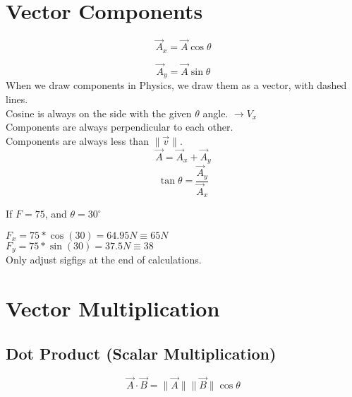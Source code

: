 \documentclass[]{article}
\date{Wednesday, January 25\textsuperscript{th}, 2023}
\title{\docTitle}
\author{\docAuthor}
\date{\today}
\begin{document}
\maketitle
\section*{Vector Components}
\begin{equation*}
    \overrightarrow{A}_x = \overrightarrow{A}\cos\theta
\end{equation*}

\begin{equation*}
    \overrightarrow{A}_y = \overrightarrow{A}\sin\theta
\end{equation*}
When we draw components in Physics, we draw them as a vector, with dashed lines.\\
Cosine is always on the side with the given $\theta$ angle. $\rightarrow V_x$\\
Components are always perpendicular to each other.\\
Components are always less than $\lVert \overrightarrow{v} \rVert$.\\
\begin{equation*}
    \overrightarrow{A} = \overrightarrow{A}_x + \overrightarrow{A}_y
\end{equation*}
\begin{equation*}
    \tan\theta = \frac{\overrightarrow{A}_y}{\overrightarrow{A}_x}
\end{equation*}

If $F = 75$, and $\theta = 30^{\circ}$

$F_x = 75 * \cos(30) = 64.95N \equiv 65N$\\

$F_y = 75 * \sin(30) = 37.5N \equiv 38$\\

Only adjust sigfigs at the end of calculations. 

\section*{Vector Multiplication}
\subsection*{Dot Product (Scalar Multiplication)}
\begin{equation*}
    \overrightarrow{A} \cdot \overrightarrow{B} = \lVert \overrightarrow{A} \rVert \lVert \overrightarrow{B} \rVert \cos\theta
\end{equation*}
\end{document}
